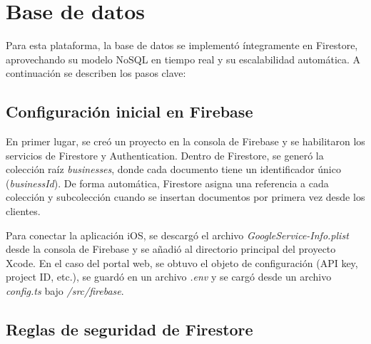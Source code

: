
\section{Base de datos}

\begin{large}

Para esta plataforma, la base de datos se implementó íntegramente en Firestore, aprovechando su modelo NoSQL en tiempo real y su escalabilidad automática. A continuación se describen los pasos clave:

\end{large}

\subsection{Configuración inicial en Firebase}

\begin{large}

En primer lugar, se creó un proyecto en la consola de Firebase y se habilitaron los servicios de Firestore y Authentication. Dentro de Firestore, se generó la colección raíz \textit{businesses}, donde cada documento tiene un identificador único (\textit{businessId}). De forma automática, Firestore asigna una referencia a cada colección y subcolección cuando se insertan documentos por primera vez desde los clientes.

Para conectar la aplicación iOS, se descargó el archivo \textit{GoogleService-Info.plist} desde la consola de Firebase y se añadió al directorio principal del proyecto Xcode. En el caso del portal web, se obtuvo el objeto de configuración (API key, project ID, etc.), se guardó en un archivo \textit{.env} y se cargó desde un archivo \textit{config.ts} bajo \textit{/src/firebase}.

\end{large}

\subsection{Reglas de seguridad de Firestore}

